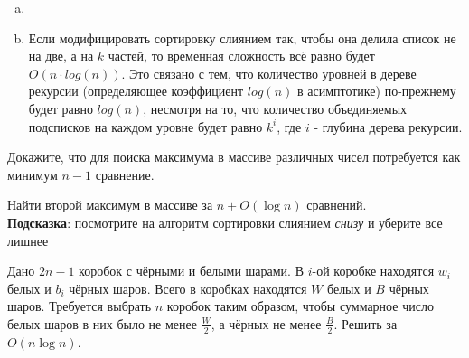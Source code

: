 \begin{solution}
    \leavevmode\vspace{1pt}
    \begin{enumerate}[a)]
        \item
        
        \item
            Если модифицировать сортировку слиянием так, чтобы она делила список не на две, а на $k$ частей,
            то временная сложность всё равно будет $O(n \cdot log(n))$. Это связано с тем, что количество уровней в дереве рекурсии
            (определяющее коэффициент $log(n)$ в асимптотике) по-прежнему будет равно $log(n)$, несмотря на то, что количество
            объединяемых подсписков на каждом уровне будет равно $k^i$, где $i$ - глубина дерева рекурсии.
    \end{enumerate}
\end{solution}


\begin{problem}
    Докажите, что для поиска максимума в массиве различных чисел потребуется как минимум $n-1$ сравнение.
\end{problem}

\begin{solution}
    \leavevmode\vspace{1pt}
    
\end{solution}


\begin{problem}
    Найти второй максимум в массиве за $n + O(\log n)$ сравнений. \\
    {\footnotesize \textbf{Подсказка}: посмотрите на алгоритм сортировки слиянием \textit{снизу} и уберите все лишнее}
\end{problem}

\begin{solution}
    \leavevmode\vspace{1pt}
    
\end{solution}


\begin{problem}
    Дано $2n - 1$ коробок с чёрными и белыми шарами.  В $i$-ой коробке находятся $w_i$ белых и $b_i$ чёрных шаров.
    Всего в коробках находятся $W$ белых и $B$ чёрных шаров.
    Требуется выбрать $n$ коробок таким образом, чтобы суммарное число белых шаров в них было не менее $\frac{W}{2}$,
    а чёрных не менее $\frac{B}{2}$. Решить за $O(n \log n)$.
\end{problem}

